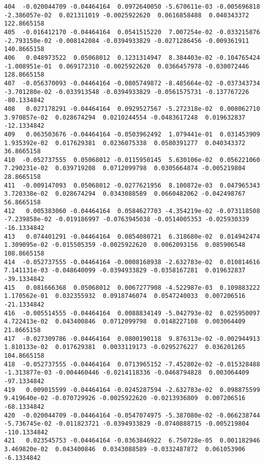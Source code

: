 \documentclass[15pt,a4paper,openright]{article}
\begin{document}
\begin{lstlisting}[language=AMPL, caption = data file]
404  -0.020044709 -0.04464164  0.0972640050 -5.670611e-03 -0.005696818 -2.386057e-02  0.021311019 -0.0025922620  0.0616858488  0.040343372  122.8665158
405  -0.016412170 -0.04464164  0.0541515220  7.007254e-02 -0.033215876 -2.793150e-02 -0.008142084 -0.0394933829 -0.0271286456 -0.009361911  140.8665158
406   0.048973522  0.05068012  0.1231314947  8.384403e-02 -0.104765424 -1.008951e-01  0.069172310 -0.0025922620  0.0366457978 -0.030072446  128.8665158
407  -0.056370093 -0.04464164 -0.0805749872 -8.485664e-02 -0.037343734 -3.701280e-02 -0.033913548 -0.0394933829 -0.0561575731 -0.137767226  -80.1334842
408   0.027178291 -0.04464164  0.0929527567 -5.272318e-02  0.008062710  3.970857e-02  0.028674294  0.0210244554 -0.0483617248  0.019632837  -12.1334842
409   0.063503676 -0.04464164 -0.0503962492  1.079441e-01  0.031453909  1.935392e-02  0.017629381  0.0236075338  0.0580391277  0.040343372   36.8665158
410  -0.052737555  0.05068012 -0.0115950145  5.630106e-02  0.056221060  7.290231e-02  0.039719208  0.0712099798  0.0305664874 -0.005219804   28.8665158
411  -0.009147093  0.05068012 -0.0277621956  8.100872e-03  0.047965343  3.720338e-02  0.028674294  0.0343088589  0.0660482062 -0.042498767   56.8665158
412   0.005383060 -0.04464164  0.0584627703 -4.354219e-02 -0.073118508 -7.239858e-02 -0.019186997 -0.0763945038 -0.0514005353 -0.025930339  -16.1334842
413   0.074401291 -0.04464164  0.0854080721  6.318680e-02  0.014942474  1.309095e-02 -0.015505359 -0.0025922620  0.0062093156  0.085906548  108.8665158
414  -0.052737555 -0.04464164 -0.0008168938 -2.632783e-02  0.010814616  7.141131e-03 -0.048640099 -0.0394933829 -0.0358167281  0.019632837  -39.1334842
415   0.081666368  0.05068012  0.0067277908 -4.522987e-03  0.109883222  1.170562e-01  0.032355932  0.0918746074  0.0547240033  0.007206516  -21.1334842
416  -0.005514555 -0.04464164  0.0088834149 -5.042793e-02  0.025950097  4.722413e-02  0.043400846  0.0712099798  0.0148227108  0.003064409   21.8665158
417  -0.027309786 -0.04464164  0.0800190118  9.876313e-02 -0.002944913  1.810133e-02  0.017629381  0.0033119173 -0.0295276227  0.036201265  104.8665158
418  -0.052737555 -0.04464164  0.0713965152 -7.452802e-02 -0.015328488 -1.313877e-03 -0.004460446 -0.0214118336 -0.0468794828  0.003064409  -97.1334842
419   0.009015599 -0.04464164 -0.0245287594 -2.632783e-02  0.098875599  9.419640e-02 -0.070729926 -0.0025922620 -0.0213936809  0.007206516  -68.1334842
420  -0.020044709 -0.04464164 -0.0547074975 -5.387080e-02 -0.066238744 -5.736745e-02 -0.011823721 -0.0394933829 -0.0740888715 -0.005219804 -110.1334842
421   0.023545753 -0.04464164 -0.0363846922  6.750728e-05  0.001182946  3.469820e-02  0.043400846  0.0343088589 -0.0332487872  0.061053906   -6.1334842

\end{lstlisting}
\end{document}
